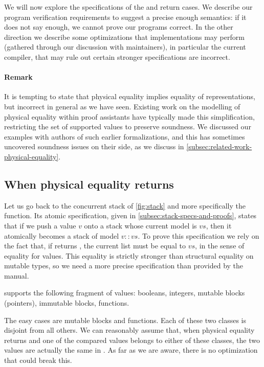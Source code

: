 We will now explore the specifications of the  and  return cases. We describe our program verification requirements to suggest a precise enough semantics: if it does not say enough, we cannot prove our programs correct. In the other direction we describe some optimizations that \OCaml implementations may perform (gathered through our discussion with \OCaml maintainers), in particular the current compiler, that may rule out certain stronger specifications are incorrect.

\paragraph{Remark} It is tempting to state that physical equality implies equality of \Rocq representations, but incorrect in general as we have seen. Existing work on the modelling of \OCaml physical equality within proof assistants have typically made this simplification, restricting the set of supported values to preserve soundness. We discussed our examples with authors of such earlier formalizations, and this has sometimes uncovered soundness issues on their side, as we discuss in \cref{subsec:related-work-physical-equality}.

\subsection{When physical equality returns }

Let us go back to the concurrent stack of \cref{fig:stack} and more specifically the  function. Its atomic specification, given in \cref{subsec:stack-specs-and-proofs}, states that if we push a value $v$ onto a stack whose current model is $vs$, then it atomically becomes a stack of model $v :: vs$.
To prove this specification we rely on the fact that, if  returns , the current list must be equal to $vs$, in the sense of \Rocq equality for \Zoo values. This equality is strictly stronger than structural equality on mutable types, so we need a more precise specification than provided by the \OCaml manual.

\Zoo supports the following fragment of \OCaml values: booleans, integers, mutable blocks (pointers), immutable blocks, functions.

The easy cases are mutable blocks and functions.
Each of these two classes is disjoint from all others.
We can reasonably assume that, when physical equality returns  and one of the compared values belongs to either of these classes, the two values are actually the same in \Rocq.
As far as we are aware, there is no optimization that could break this.

